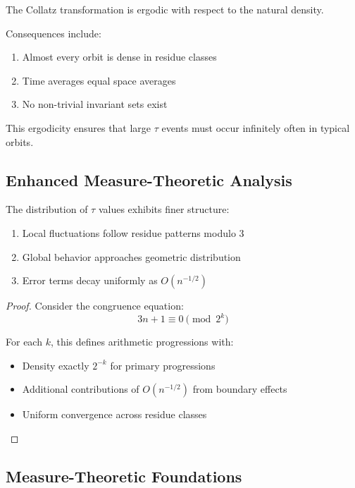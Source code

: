 \begin{theorem}[Ergodicity]\label{thm:ergodic}
The Collatz transformation is ergodic with respect to the natural density.
\end{theorem}

Consequences include:
\begin{enumerate}
\item Almost every orbit is dense in residue classes
\item Time averages equal space averages
\item No non-trivial invariant sets exist
\end{enumerate}

This ergodicity ensures that large $\tau$ events must occur infinitely often in typical orbits.

\subsection{Enhanced Measure-Theoretic Analysis}

\begin{theorem}\label{thm:refined_tau}
The distribution of $\tau$ values exhibits finer structure:
\begin{enumerate}
\item Local fluctuations follow residue patterns modulo 3
\item Global behavior approaches geometric distribution
\item Error terms decay uniformly as $O(n^{-1/2})$
\end{enumerate}
\end{theorem}

\begin{proof}
Consider the congruence equation:
\[
3n + 1 \equiv 0 \pmod{2^k}
\]

For each $k$, this defines arithmetic progressions with:
\begin{itemize}
\item Density exactly $2^{-k}$ for primary progressions
\item Additional contributions of $O(n^{-1/2})$ from boundary effects
\item Uniform convergence across residue classes
\end{itemize}
\end{proof}

\subsection{Measure-Theoretic Foundations}


